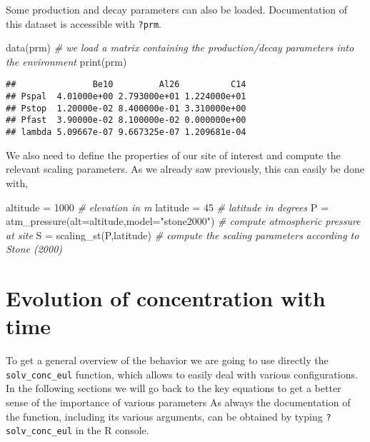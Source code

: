 \documentclass[
]{book}
\newenvironment{Shaded}{\begin{snugshade}}{\end{snugshade}}
\newcommand{\AttributeTok}[1]{\textcolor[rgb]{0.77,0.63,0.00}{#1}}
\newcommand{\CommentTok}[1]{\textcolor[rgb]{0.56,0.35,0.01}{\textit{#1}}}
\newcommand{\DecValTok}[1]{\textcolor[rgb]{0.00,0.00,0.81}{#1}}
\newcommand{\FunctionTok}[1]{\textcolor[rgb]{0.00,0.00,0.00}{#1}}
\newcommand{\NormalTok}[1]{#1}
\newcommand{\OtherTok}[1]{\textcolor[rgb]{0.56,0.35,0.01}{#1}}
\newcommand{\StringTok}[1]{\textcolor[rgb]{0.31,0.60,0.02}{#1}}
\begin{document}
Some production and decay parameters can also be loaded.
Documentation of this dataset is accessible with \texttt{?prm}.

\begin{Shaded}
\begin{Highlighting}[]
\FunctionTok{data}\NormalTok{(prm) }\CommentTok{\# we load a matrix containing the production/decay parameters into the environment}
\FunctionTok{print}\NormalTok{(prm)}
\end{Highlighting}
\end{Shaded}

\begin{verbatim}
##               Be10         Al26          C14
## Pspal  4.01000e+00 2.793000e+01 1.224000e+01
## Pstop  1.20000e-02 8.400000e-01 3.310000e+00
## Pfast  3.90000e-02 8.100000e-02 0.000000e+00
## lambda 5.09667e-07 9.667325e-07 1.209681e-04
\end{verbatim}

We also need to define the properties of our site of interest and compute the relevant scaling parameters. As we already saw previously, this can easily be done with,

\begin{Shaded}
\begin{Highlighting}[]
\NormalTok{altitude }\OtherTok{=} \DecValTok{1000} \CommentTok{\# elevation in m}
\NormalTok{latitude }\OtherTok{=} \DecValTok{45} \CommentTok{\# latitude in degrees}
\NormalTok{P }\OtherTok{=} \FunctionTok{atm\_pressure}\NormalTok{(}\AttributeTok{alt=}\NormalTok{altitude,}\AttributeTok{model=}\StringTok{"stone2000"}\NormalTok{) }\CommentTok{\# compute atmospheric pressure at site}
\NormalTok{S }\OtherTok{=} \FunctionTok{scaling\_st}\NormalTok{(P,latitude) }\CommentTok{\# compute the scaling parameters according to Stone (2000)}
\end{Highlighting}
\end{Shaded}

\hypertarget{evolution-of-concentration-with-time}{%
\section{Evolution of concentration with time}\label{evolution-of-concentration-with-time}}

To get a general overview of the behavior we are going to use directly the \texttt{solv\_conc\_eul} function, which allows to easily deal with various configurations. In the following sections we will go back to the key equations to get a better sense of the importance of various parameters
As always the documentation of the function, including its various arguments, can be obtained by typing \texttt{?solv\_conc\_eul} in the R console.
\end{document}
